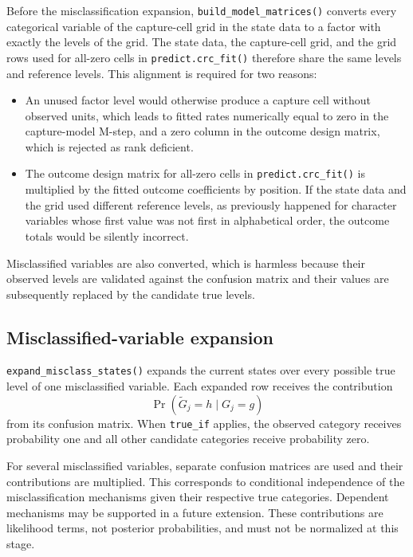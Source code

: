 \documentclass[11pt,letterpaper]{article}
\begin{document}
Before the misclassification expansion, \texttt{build\_model\_matrices()}
converts every categorical variable of the capture-cell grid in the state data
to a factor with exactly the levels of the grid. The state data, the
capture-cell grid, and the grid rows used for all-zero cells in
\texttt{predict.crc\_fit()} therefore share the same levels and reference
levels. This alignment is required for two reasons:

\begin{itemize}
  \item An unused factor level would otherwise produce a capture cell without
  observed units, which leads to fitted rates numerically equal to zero in
  the capture-model M-step, and a zero column in the outcome design matrix,
  which is rejected as rank deficient.
  \item The outcome design matrix for all-zero cells in
  \texttt{predict.crc\_fit()} is multiplied by the fitted outcome
  coefficients by position. If the state data and the grid used different
  reference levels, as previously happened for character variables whose
  first value was not first in alphabetical order, the outcome totals would
  be silently incorrect.
\end{itemize}

Misclassified variables are also converted, which is harmless because their
observed levels are validated against the confusion matrix and their values
are subsequently replaced by the candidate true levels.

\subsection{Misclassified-variable expansion}

\texttt{expand\_misclass\_states()} expands the current states over every
possible true level of one misclassified variable. Each expanded row receives
the contribution
\[
  \Pr(\widetilde G_j=h\mid G_j=g)
\]
from its confusion matrix. When \texttt{true\_if} applies, the observed
category receives probability one and all other candidate categories receive
probability zero.

For several misclassified variables, separate confusion matrices are used and
their contributions are multiplied. This corresponds to conditional
independence of the misclassification mechanisms given their respective true
categories. Dependent mechanisms may be supported in a future extension.
These contributions are likelihood terms, not posterior probabilities, and
must not be normalized at this stage.
\end{document}
